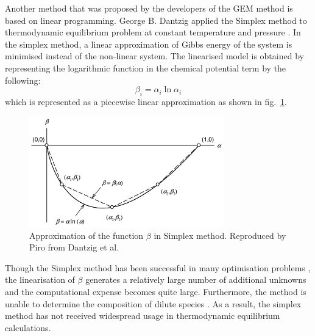 	Another method that was proposed by the developers of the GEM method is based on linear programming. George B. Dantzig applied the Simplex method to thermodynamic equilibrium problem at constant temperature and pressure \cite{Dantzig:1957aa,Dantzig:1958aa}. In the simplex method, a linear approximation of Gibbs energy of the system is minimised instead of the non-linear system. The linearised model is obtained by representing the logarithmic function in the chemical potential term by the following:
	\begin{equation}
		\beta_i = \alpha_i \ln \alpha_i
	\end{equation}
 which is represented as a piecewise linear approximation as shown in fig.~\ref{fig:simplex}.
 	\begin{figure}[htbp]
		\centering
		\includegraphics[width=0.75\textwidth]{figures/chapter-5/Simplex}
		\caption[Approximation of the function $\beta$ in simplex method.]{Approximation of the function $\beta$ in Simplex method. Reproduced by Piro \cite{Piro11b} from Dantzig et al. \cite{Dantzig:1957aa}}
		\label{fig:simplex}
	\end{figure}
	Though the Simplex method has been successful in many optimisation problems \cite{Dantzig:2016aa}, the linearisation of $\beta$ generates a relatively large number of additional unknowns and the computational expense becomes quite large. Furthermore, the method is unable to determine the composition of dilute species \cite{vanZeggeren11}. As a result, the simplex method has not received widespread usage in thermodynamic equilibrium calculations.


